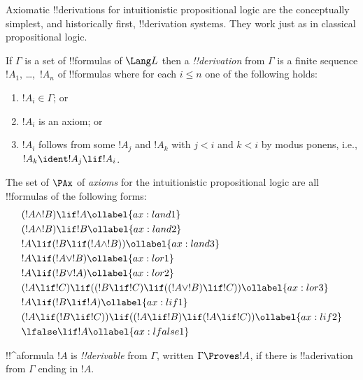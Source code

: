 \documentclass[../../../include/open-logic-section]{subfiles}
\begin{document}


Axiomatic !!{derivation}s for intuitionistic propositional logic are
the conceptually simplest, and historically first, !!{derivation}
systems. They work just as in classical propositional logic.

\begin{defn}[!!^{derivability}]
If $\Gamma$ is a set of !!{formula}s of $\Lang L$ then a
\emph{!!{derivation}} from $\Gamma$ is a finite sequence $!A_1$,
\dots,~$!A_n$ of !!{formula}s where for each $i \le n$ one of the
following holds:
\begin{enumerate}
\item $!A_i \in \Gamma$; or
\item $!A_i$ is an axiom; or
\item $!A_i$ follows from some $!A_j$ and $!A_k$ with $j < i$ and $k <
  i$ by modus ponens, i.e., $!A_k \ident !A_j \lif !A_i$.
\end{enumerate}
\end{defn}

\begin{defn}[Axioms]
The set of $\PAx$ of \emph{axioms} for the intuitionistic propositional logic 
are all !!{formula}s of the following forms:
\begin{align}
  & (!A \land !B) \lif !A \ollabel{ax:land1}\\
  & (!A \land !B) \lif !B \ollabel{ax:land2}\\
  & !A \lif (!B \lif (!A \land !B)) \ollabel{ax:land3}\\
  & !A \lif (!A \lor !B) \ollabel{ax:lor1}\\
  & !A \lif (!B \lor !A) \ollabel{ax:lor2}\\
  & (!A \lif !C) \lif ((!B \lif !C) \lif ((!A \lor !B) \lif !C)) \ollabel{ax:lor3}\\
  & !A \lif (!B \lif !A) \ollabel{ax:lif1}\\
  & (!A \lif (!B \lif !C)) \lif ((!A \lif !B) \lif (!A \lif !C)) \ollabel{ax:lif2}\\
  & \lfalse \lif !A \ollabel{ax:lfalse1}
\end{align}
\end{defn}

\begin{defn}[!!^{derivability}]
!!^a{formula} $!A$ is \emph{!!{derivable}} from $\Gamma$, written
$\Gamma \Proves !A$, if there is !!a{derivation} from $\Gamma$ ending
in $!A$.
\end{defn}
\end{document}
